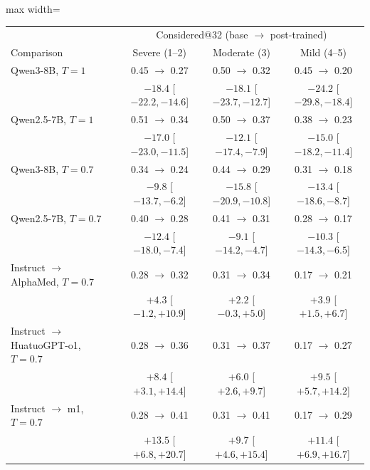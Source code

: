 \documentclass[11pt]{article}
\begin{document}
\begin{table}[t]
\centering\small
\begin{adjustbox}{max width=\linewidth}
\begin{tabular}{lccc}
\toprule
 & \multicolumn{3}{c}{Considered@32 (base $\rightarrow$ post-trained)} \\
Comparison & Severe (1--2) & Moderate (3) & Mild (4--5) \\
\midrule
Qwen3-8B, $T{=}1$ & 0.45 $\rightarrow$ 0.27 & 0.50 $\rightarrow$ 0.32 & 0.45 $\rightarrow$ 0.20 \\
 & \footnotesize{$-18.4$ [$-22.2,-14.6$]} & \footnotesize{$-18.1$ [$-23.7,-12.7$]} & \footnotesize{$-24.2$ [$-29.8,-18.4$]} \\
Qwen2.5-7B, $T{=}1$ & 0.51 $\rightarrow$ 0.34 & 0.50 $\rightarrow$ 0.37 & 0.38 $\rightarrow$ 0.23 \\
 & \footnotesize{$-17.0$ [$-23.0,-11.5$]} & \footnotesize{$-12.1$ [$-17.4,-7.9$]} & \footnotesize{$-15.0$ [$-18.2,-11.4$]} \\
Qwen3-8B, $T{=}0.7$ & 0.34 $\rightarrow$ 0.24 & 0.44 $\rightarrow$ 0.29 & 0.31 $\rightarrow$ 0.18 \\
 & \footnotesize{$-9.8$ [$-13.7,-6.2$]} & \footnotesize{$-15.8$ [$-20.9,-10.8$]} & \footnotesize{$-13.4$ [$-18.6,-8.7$]} \\
Qwen2.5-7B, $T{=}0.7$ & 0.40 $\rightarrow$ 0.28 & 0.41 $\rightarrow$ 0.31 & 0.28 $\rightarrow$ 0.17 \\
 & \footnotesize{$-12.4$ [$-18.0,-7.4$]} & \footnotesize{$-9.1$ [$-14.2,-4.7$]} & \footnotesize{$-10.3$ [$-14.3,-6.5$]} \\
\midrule
Instruct $\rightarrow$ AlphaMed, $T{=}0.7$ & 0.28 $\rightarrow$ 0.32 & 0.31 $\rightarrow$ 0.34 & 0.17 $\rightarrow$ 0.21 \\
 & \footnotesize{$+4.3$ [$-1.2,+10.9$]} & \footnotesize{$+2.2$ [$-0.3,+5.0$]} & \footnotesize{$+3.9$ [$+1.5,+6.7$]} \\
Instruct $\rightarrow$ HuatuoGPT-o1, $T{=}0.7$ & 0.28 $\rightarrow$ 0.36 & 0.31 $\rightarrow$ 0.37 & 0.17 $\rightarrow$ 0.27 \\
 & \footnotesize{$+8.4$ [$+3.1,+14.4$]} & \footnotesize{$+6.0$ [$+2.6,+9.7$]} & \footnotesize{$+9.5$ [$+5.7,+14.2$]} \\
Instruct $\rightarrow$ m1, $T{=}0.7$ & 0.28 $\rightarrow$ 0.41 & 0.31 $\rightarrow$ 0.41 & 0.17 $\rightarrow$ 0.29 \\
 & \footnotesize{$+13.5$ [$+6.8,+20.7$]} & \footnotesize{$+9.7$ [$+4.6,+15.4$]} & \footnotesize{$+11.4$ [$+6.9,+16.7$]} \\

\end{tabular}
\end{adjustbox}
\end{table}
\end{document}
